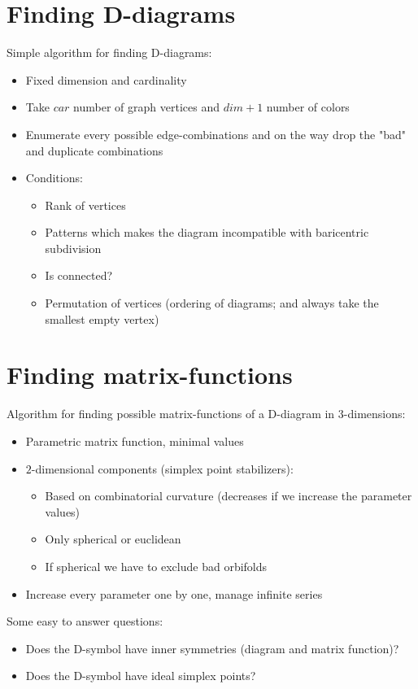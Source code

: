 \section{Finding D-diagrams}
\begin{frame}
  Simple algorithm for finding D-diagrams:
  \begin{itemize}
    \item Fixed dimension and cardinality
    \item Take $car$ number of graph vertices and $dim+1$ number of colors
    \item Enumerate every possible edge-combinations and on the way drop the
      "bad" and duplicate combinations
    \item Conditions:
      \begin{itemize}
	\item Rank of vertices
	\item Patterns which makes the diagram incompatible with baricentric
	  subdivision
	\item Is connected?
	\item Permutation of vertices (ordering of diagrams; and always take the
	  smallest empty vertex)
      \end{itemize}
  \end{itemize}
\end{frame}

\section{Finding matrix-functions}
\begin{frame}
  Algorithm for finding possible matrix-functions of a D-diagram in
  $3$-dimensions:
  \begin{itemize}
    \item Parametric matrix function, minimal values
    \item $2$-dimensional components (simplex point stabilizers):
      \begin{itemize}
	\item Based on combinatorial curvature (decreases if we increase the
	  parameter values)
	\item Only spherical or euclidean
	\item If spherical we have to exclude bad orbifolds
      \end{itemize}
    \item Increase every parameter one by one, manage infinite series
  \end{itemize}
  Some easy to answer questions:
  \begin{itemize}
    \item Does the D-symbol have inner symmetries (diagram and matrix function)?
    \item Does the D-symbol have ideal simplex points?
  \end{itemize}
\end{frame}


